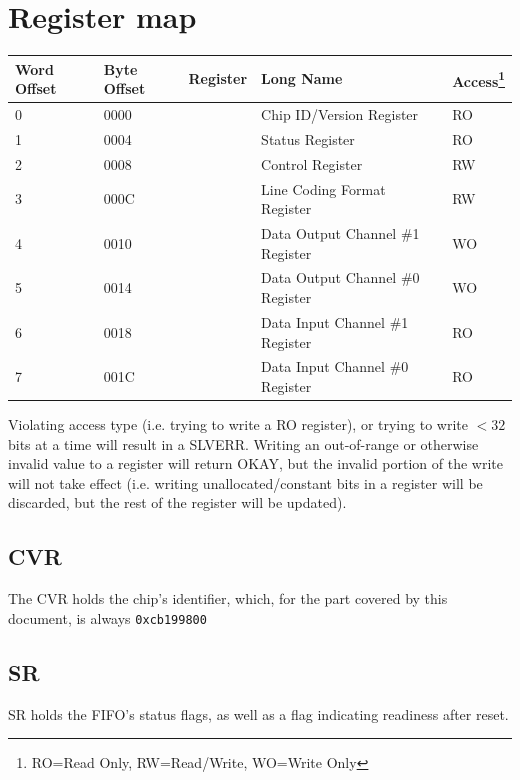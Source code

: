 \documentclass{datasheet}
\begin{document}
	\section{Register map}
	\begin{minipage}{\textwidth}
		\begin{tabular}{|l|l|l|l|l|}
			\hline
			\textbf{Word Offset} & \textbf{Byte Offset} & \textbf{Register} & \textbf{Long Name} & \textbf{Access\footnote{RO=Read Only, RW=Read/Write, WO=Write Only}}\\\hline
			0 & 0000 & \nameref{sec:reg:cvr} & Chip ID/Version Register & RO\\\hline
			1 & 0004 & \nameref{sec:reg:sr} & Status Register & RO\\\hline
			2 & 0008 & \nameref{sec:reg:cr} & Control Register & RW\\\hline
			3 & 000C & \nameref{sec:reg:lcfr} & Line Coding Format Register & RW\\\hline
			4 & 0010 & \nameref{sec:reg:dout1r} & Data Output Channel \#1 Register & WO\\\hline
			5 & 0014 & \nameref{sec:reg:dout0r} & Data Output Channel \#0 Register & WO\\\hline
			6 & 0018 & \nameref{sec:reg:din1r} & Data Input Channel \#1 Register & RO\\\hline
			7 & 001C & \nameref{sec:reg:din0r} & Data Input Channel \#0 Register & RO\\\hline
		\end{tabular}
	\end{minipage}
	Violating access type (i.e. trying to write a RO register), or trying to write $<32$ bits at a time will result in a SLVERR. Writing an out-of-range or otherwise invalid value to a register will return OKAY, but the invalid portion of the write will not take effect (i.e. writing unallocated/constant bits in a register will be discarded, but the rest of the register will be updated).

	\subsection{CVR}\label{sec:reg:cvr}
	The CVR holds the chip's identifier, which, for the part covered by this document, is always \texttt{0xcb199800}

	\subsection{SR}\label{sec:reg:sr}
	SR holds the FIFO's status flags, as well as a flag indicating readiness after reset.
\end{document}
